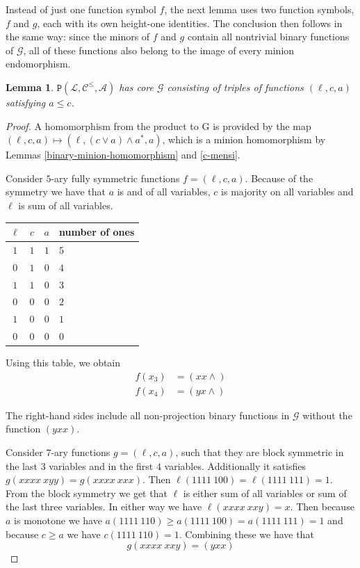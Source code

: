 \documentclass{amsart}
\numberwithin{equation}{section}
\theoremstyle{plain}
\newtheorem{lemma}[theorem]{Lemma}
\theoremstyle{definition}
\def\clone#1{\mathcal{#1}}
\def\minion#1{\mathcal{#1}}
\def\Ac{\clone{A}}
\def\Lc{\clone{L}}
\def\Cc{\clone{C}}
\def\C#1{{\mathtt{P}}(#1)}
\begin{document}
Instead of just one function symbol $f$, the next lemma uses two function symbols, $f$ and $g$, each with its own height-one identities. The conclusion then follows in the same way: since the minors of $f$ and $g$ contain all nontrivial binary functions of $\minion{G}$, all of these functions also belong to the image of every minion endomorphism.

\begin{lemma}\label{lcleqa} $\C{\Lc,\Cc^\leq,\Ac}$ has core $\minion{G}$ consisting of triples of functions $(\ell,c,a)$ satisfying $a\leq c$.
\end{lemma}
\begin{proof}
  A homomorphism from the product to G is provided by the map $(\ell, c,a)\mapsto (\ell, (c\vee a)\wedge a^*,a)$, which is a minion homomorphism by Lemmas \ref{binary-minion-homomorphism} and \ref{c-mensi}.

Consider $5$-ary fully symmetric functions $f= (\ell, c, a)$. 
Because of the symmetry we have that $a$ is and of all variables, $c$ is majority on all variables and $\ell$ is sum of all variables.

\begin{center}
\begin{tabular}{ |ccc|l } 
 \hline
 $\ell$ & $c$ & $a$ & number of ones \\ 
  \hline
   $1$ & $1$ & $1$ & $5$ \\ 
   $0$ & $1$ & $0$ & $4$ \\ 
   $1$ &  $1$ & $0$ & $3$ \\ 
   $0$ &  $0$ & $0$ & $2$ \\ 
   $1$ &  $0$ & $0$ & $1$ \\ 
   $0$ &  $0$ & $0$ & $0$ \\ 
 \hline
\end{tabular}
\end{center}

Using this table, we obtain
\begin{align*}
f(x_{3}) &= (xx{\wedge}) \\
f(x_{4}) &= (yx{\wedge})
\end{align*}

The right-hand sides include all non-projection binary functions in $\minion{G}$ without the function $(yxx)$.

Consider $7$-ary functions $g=(\ell,c,a)$, such that they are block symmetric in the last $3$ variables and in the first $4$ variables. Additionally it satisfies $g(xxxx\ xyy) = g(xxxx\ xxx)$. Then $\ell(1111\ 100) = \ell(1111\ 111) = 1$. From the block symmetry we get that $\ell$ is either sum of all variables or sum of the last three variables. In either way we have $\ell(xxxx\ xxy) = x$. Then because $a$ is monotone we have $a(1111\ 110) \geq a(1111\ 100) = a(1111\ 111) = 1$ and because $c\geq a$ we have $c(1111\ 110) = 1$. 
Combining these we have that 
$$g(xxxx\ xxy) = (yxx)$$


\end{proof}
\end{document}
